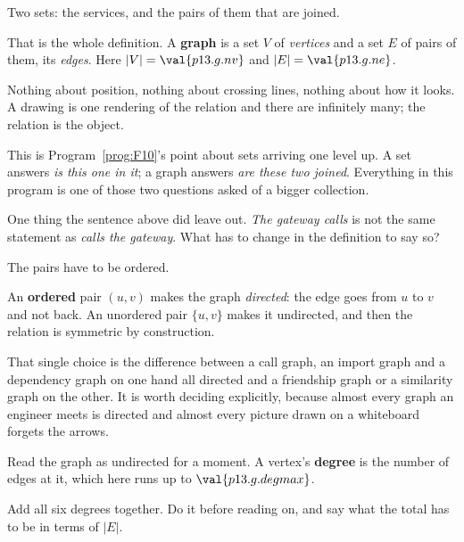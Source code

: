 \begin{fr}
\begin{ansblock}
Two sets: the services, and the pairs of them that are joined.
\end{ansblock}

That is the whole definition. A \textbf{graph} is a set $V$ of
\emph{vertices} and a set $E$ of pairs of them, its \emph{edges}. Here
$\lvert V \rvert = \val{p13.g.nv}$ and $\lvert E \rvert = \val{p13.g.ne}$.

Nothing about position, nothing about crossing lines, nothing about how it
looks. A drawing is one rendering of the relation and there are infinitely
many; the relation is the object.

\begin{note}
This is Program~\ref{prog:F10}'s point about sets arriving one level up. A set
answers \emph{is this one in it}; a graph answers \emph{are these two
joined}. Everything in this program is one of those two questions asked of a
bigger collection.
\end{note}

One thing the sentence above did leave out. \emph{The gateway calls
} is not the same statement as \emph{ calls the
gateway}. What has to change in the definition to say so?
\nextframe
\end{fr}

\begin{fr}
\begin{ansblock}
The pairs have to be ordered.
\end{ansblock}

An \textbf{ordered} pair $(u, v)$ makes the graph \emph{directed}: the edge
goes from $u$ to $v$ and not back. An unordered pair $\{u, v\}$ makes it
undirected, and then the relation is symmetric by construction.

That single choice is the difference between a call graph, an import graph and
a dependency graph on one hand \dash{} all directed \dash{} and a friendship
graph or a similarity graph on the other. It is worth deciding explicitly,
because almost every graph an engineer meets is directed and almost every
picture drawn on a whiteboard forgets the arrows.

\end{fr}

\begin{fr}
Read the graph as undirected for a moment. A vertex's \textbf{degree} is the
number of edges at it, which here runs up to $\val{p13.g.degmax}$.

Add all six degrees together. Do it before reading on, and say what the total
has to be in terms of $\lvert E \rvert$.
\dotline
\nextframe
\end{fr}

